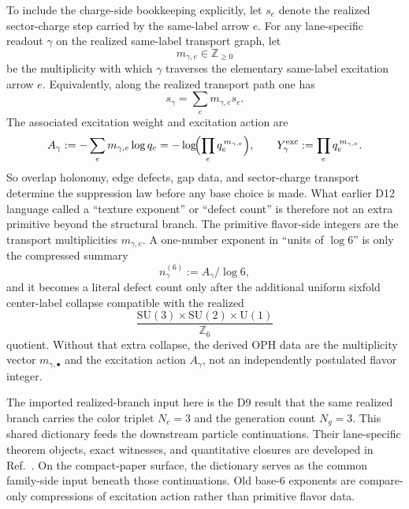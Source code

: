 \documentclass[11pt]{article}
\newcommand{\SU}{\mathrm{SU}}
\newcommand{\U}{\mathrm{U}}
\begin{document}
To include the charge-side bookkeeping explicitly, let \(s_e\) denote the realized sector-charge step carried by the same-label arrow \(e\). For any lane-specific readout \(\gamma\) on the realized same-label transport graph, let
\[
m_{\gamma,e}\in\mathbb Z_{\ge 0}
\]
be the multiplicity with which \(\gamma\) traverses the elementary same-label excitation arrow \(e\). Equivalently, along the realized transport path one has
\[
s_\gamma=\sum_e m_{\gamma,e}s_e.
\]
The associated excitation weight and excitation action are
\[
A_\gamma
:=
-\sum_e m_{\gamma,e}\log q_e
=
-\log\!\Bigl(\prod_e q_e^{\,m_{\gamma,e}}\Bigr),
\qquad
Y_\gamma^{\mathrm{exc}}
:=
\prod_e q_e^{\,m_{\gamma,e}}.
\]
So overlap holonomy, edge defects, gap data, and sector-charge transport determine the suppression law before any base choice is made. What earlier D12 language called a ``texture exponent'' or ``defect count'' is therefore not an extra primitive beyond the structural branch. The primitive flavor-side integers are the transport multiplicities \(m_{\gamma,e}\). A one-number exponent in ``units of \(\log 6\)'' is only the compressed summary
\[
n_\gamma^{(6)}:=A_\gamma/\log 6,
\]
and it becomes a literal defect count only after the additional uniform sixfold center-label collapse compatible with the realized
\[
\frac{\SU(3)\times\SU(2)\times\U(1)}{\mathbb Z_6}
\]
quotient. Without that extra collapse, the derived OPH data are the multiplicity vector \(m_{\gamma,\bullet}\) and the excitation action \(A_\gamma\), not an independently postulated flavor integer.

The imported realized-branch input here is the D9 result that the same realized branch carries the color triplet \(N_c=3\) and the generation count \(N_g=3\).
This shared dictionary feeds the downstream particle continuations. Their lane-specific theorem
objects, exact witnesses, and quantitative closures are developed in
Ref.~\cite{ophparticles}. On the compact-paper surface, the dictionary serves as the common
family-side input beneath those continuations. Old base-6 exponents are compare-only
compressions of excitation action rather than primitive flavor data.
\end{document}
